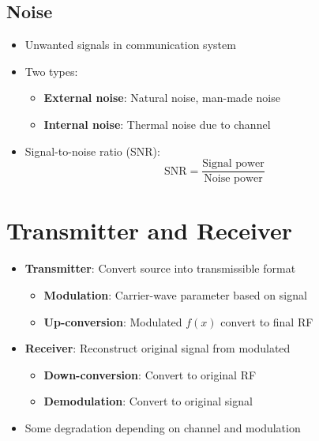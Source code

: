 \documentclass[conference]{IEEEtran}
\begin{document}
\subsection{Noise}

\begin{itemize}
    \item Unwanted signals in communication system 
    
    \item Two types: 
    \begin{itemize}
        \item \textbf{External noise}: Natural noise, man-made noise
        \item \textbf{Internal noise}: Thermal noise due to channel
    \end{itemize}

    \item Signal-to-noise ratio (SNR): 
    $$
        \text{SNR} = \frac{\text{Signal power}}{\text{Noise power}}
    $$
\end{itemize}

\section{Transmitter and Receiver}

\begin{itemize}
    \item \textbf{Transmitter}: Convert source into transmissible format
    \begin{itemize}
        \item \textbf{Modulation}: Carrier-wave parameter based on signal
        \item \textbf{Up-conversion}: Modulated $f(x)$ convert to final RF
    \end{itemize}

    \item \textbf{Receiver}: Reconstruct original signal from modulated 
    \begin{itemize}
        \item \textbf{Down-conversion}: Convert to original RF
        \item \textbf{Demodulation}: Convert to original signal 
    \end{itemize}

    \item Some degradation depending on channel and modulation
\end{itemize}
\end{document}
